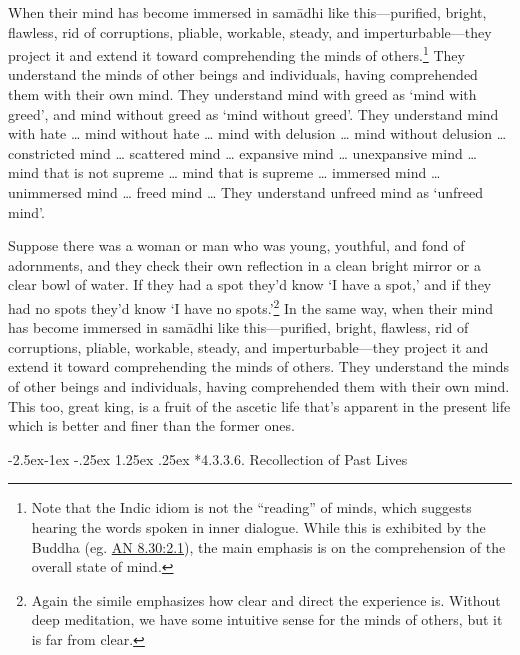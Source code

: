 \documentclass[12pt,openany]{book}%
\makeatletter
\renewcommand\paragraph{\@startsection{paragraph}{4}{\z@}%
            {-2.5ex\@plus -1ex \@minus -.25ex}%
            {1.25ex \@plus .25ex}%
            {\noindent\normalfont\itshape\small}}
\makeatother
\begin{document}
When their mind has become immersed in \textsanskrit{samādhi} like this—purified, bright, flawless, rid of corruptions, pliable, workable, steady, and imperturbable—they project it and extend it toward comprehending the minds of others.\footnote{Note that the Indic idiom is not the “reading” of minds, which suggests hearing the words spoken in inner dialogue. While this is exhibited by the Buddha (eg. \href{https://suttacentral.net/an8.30/en/sujato\#2.1}{AN 8.30:2.1}), the main emphasis is on the comprehension of the overall state of mind. } They understand the minds of other beings and individuals, having comprehended them with their own mind. They understand mind with greed as ‘mind with greed’, and mind without greed as ‘mind without greed’. They understand mind with hate … mind without hate … mind with delusion … mind without delusion … constricted mind … scattered mind … expansive mind … unexpansive mind … mind that is not supreme … mind that is supreme … immersed mind … unimmersed mind … freed mind … They understand unfreed mind as ‘unfreed mind’. 

Suppose there was a woman or man who was young, youthful, and fond of adornments, and they check their own reflection in a clean bright mirror or a clear bowl of water. If they had a spot they’d know ‘I have a spot,’ and if they had no spots they’d know ‘I have no spots.’\footnote{Again the simile emphasizes how clear and direct the experience is. Without deep meditation, we have some intuitive sense for the minds of others, but it is far from clear. } In the same way, when their mind has become immersed in \textsanskrit{samādhi} like this—purified, bright, flawless, rid of corruptions, pliable, workable, steady, and imperturbable—they project it and extend it toward comprehending the minds of others. They understand the minds of other beings and individuals, having comprehended them with their own mind. This too, great king, is a fruit of the ascetic life that’s apparent in the present life which is better and finer than the former ones. 

\paragraph*{4.3.3.6. Recollection of Past Lives }
\end{document}
